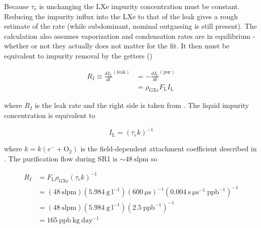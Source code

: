 Because $\tau_e$ is unchanging the LXe impurity concentration must be constant.  Reducing the impurity influx into the LXe to that of the
leak
gives a rough estimate of the rate (while subdominant, nominal outgassing is still present).  The calculation also
assumes vaporization and condensation rates are in equilibrium - whether or not they actually does not matter for the fit.  It then must
be equivalent to impurity removal by the getters ()

\begin{equation}
\begin{aligned}
R_I \equiv \frac{dI_{\mathrm{L}}}{dt}^{(\mathrm{leak})} &= -\frac{dI_{\mathrm{L}}}{dt}^{(\mathrm{pur})}
\\
&= \rho_{\mathrm{GXe}} F_{\mathrm{L}} I_{\mathrm{L}}
\end{aligned}
\end{equation}

\noindent where $R_I$ is the leak rate and the right side is taken from .  The liquid
impurity concentration is equivalent to

\vspace{-10pt}

\begin{equation}
I_{\mathrm{L}} = ( \tau_e k)^{-1}
\end{equation}

\noindent where $k = k(e^- + \mathrm{O_2})$ is the field-dependent \electron attachment coefficient described in
.  The purification flow during SR1 is ${\sim} 48\ \mathrm{slpm}$ so

\vspace{-10pt}

\begin{equation}
\begin{aligned}
R_I &= F_{\mathrm{L}} \rho_{\mathrm{GXe}} (\tau_e k)^{-1} \\[2pt]
&= (48\ \mathrm{slpm}) (5.984\ \mathrm{g\ l^{-1}}) (600\ \mathrm{\mu s})^{-1} (0.004\ \mathrm{s\ \mu s^{-1}\ ppb^{-1}})^{-1} \\[2pt]
&= (48\ \mathrm{slpm}) (5.984\ \mathrm{g\ l^{-1}}) (2.5\ \mathrm{ppb^{-1}})^{-1} \\[2pt]
&= 165\ \mathrm{ppb\ kg\ day^{-1}}
\label{eq:electron_lifetime_model_outgassing_leak}
\end{aligned}
\end{equation}

